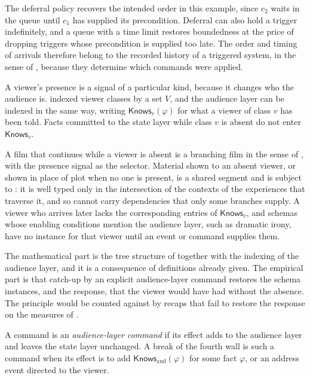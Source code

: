 The deferral policy recovers the intended order in this example, since $c_2$ waits in the queue until $c_1$ has supplied its precondition. Deferral can also hold a trigger indefinitely, and a queue with a time limit restores boundedness at the price of dropping triggers whose precondition is supplied too late. The order and timing of arrivals therefore belong to the recorded history of a triggered system, in the sense of , because they determine which commands were applied.

A viewer's presence is a signal of a particular kind, because it changes who the audience is.  indexed viewer classes by a set $V$, and the audience layer can be indexed in the same way, writing $\mathsf{Knows}_v(\varphi)$ for what a viewer of class $v$ has been told. Facts committed to the state layer while class $v$ is absent do not enter $\mathsf{Knows}_v$.

\begin{principle}\label{pr:unwatched}
A film that continues while a viewer is absent is a branching film in the sense of , with the presence signal as the selector. Material shown to an absent viewer, or shown in place of plot when no one is present, is a shared segment and is subject to : it is well typed only in the intersection of the contexts of the experiences that traverse it, and so cannot carry dependencies that only some branches supply. A viewer who arrives later lacks the corresponding entries of $\mathsf{Knows}_v$, and schemas whose enabling conditions mention the audience layer, such as dramatic irony, have no instance for that viewer until an event or command supplies them.
\end{principle}

The mathematical part is the tree structure of  together with the indexing of the audience layer, and it is a consequence of definitions already given. The empirical part is that catch-up by an explicit audience-layer command restores the schema instances, and the response, that the viewer would have had without the absence. The principle would be counted against by recaps that fail to restore the response on the measures of .

\begin{definition}\label{def:audcmd}
A command is an \emph{audience-layer command} if its effect adds to the audience layer and leaves the state layer unchanged. A break of the fourth wall is such a command when its effect is to add $\mathsf{Knows}_{\mathrm{aud}}(\varphi)$ for some fact $\varphi$, or an address event directed to the viewer.
\end{definition}

